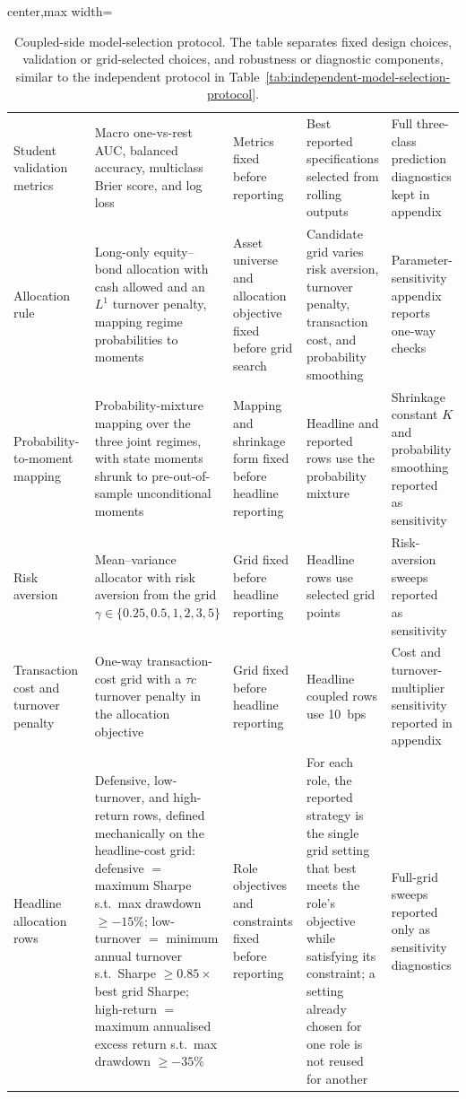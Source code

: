 \begin{table}[p]
\begin{adjustbox}{center,max width=\linewidth}
\begin{tabular}{p{0.20\linewidth}p{0.30\linewidth}p{0.17\linewidth}p{0.18\linewidth}p{0.18\linewidth}}
Student validation metrics & Macro one-vs-rest AUC, balanced accuracy, multiclass Brier score, and log loss & Metrics fixed before reporting & Best reported specifications selected from rolling outputs & Full three-class prediction diagnostics kept in appendix \\
Allocation rule & Long-only equity--bond allocation with cash allowed and an $L^1$ turnover penalty, mapping regime probabilities to moments & Asset universe and allocation objective fixed before grid search & Candidate grid varies risk aversion, turnover penalty, transaction cost, and probability smoothing & Parameter-sensitivity appendix reports one-way checks \\
Probability-to-moment mapping & Probability-mixture mapping over the three joint regimes, with state moments shrunk to pre-out-of-sample unconditional moments & Mapping and shrinkage form fixed before headline reporting & Headline and reported rows use the probability mixture & Shrinkage constant $K$ and probability smoothing reported as sensitivity \\
Risk aversion & Mean--variance allocator with risk aversion from the grid $\gamma\in\{0.25,0.5,1,2,3,5\}$ & Grid fixed before headline reporting & Headline rows use selected grid points & Risk-aversion sweeps reported as sensitivity \\
Transaction cost and turnover penalty & One-way transaction-cost grid with a $\tau c$ turnover penalty in the allocation objective & Grid fixed before headline reporting & Headline coupled rows use 10~bps & Cost and turnover-multiplier sensitivity reported in appendix \\
Headline allocation rows & Defensive, low-turnover, and high-return rows, defined mechanically on the headline-cost grid: defensive $=$ maximum Sharpe s.t.\ max drawdown $\ge -15\%$; low-turnover $=$ minimum annual turnover s.t.\ Sharpe $\ge 0.85\times$ best grid Sharpe; high-return $=$ maximum annualised excess return s.t.\ max drawdown $\ge -35\%$ & Role objectives and constraints fixed before reporting & For each role, the reported strategy is the single grid setting that best meets the role's objective while satisfying its constraint; a setting already chosen for one role is not reused for another & Full-grid sweeps reported only as sensitivity diagnostics \\
\bottomrule
\end{tabular}
\end{adjustbox}
\caption{Coupled-side model-selection protocol. The table separates fixed design choices,
validation or grid-selected choices, and robustness or diagnostic components, similar to the
independent protocol in Table~\ref{tab:independent-model-selection-protocol}.}
\label{tab:coupled-model-selection-protocol}
\end{table}

\FloatBarrier


